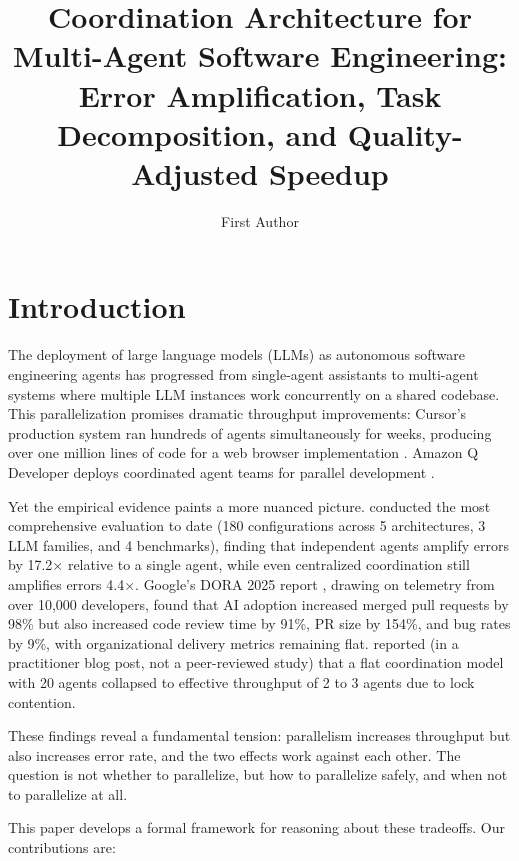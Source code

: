 \documentclass[11pt, a4paper, logo, copyright]{googledeepmind}
\title{Coordination Architecture for Multi-Agent Software Engineering: Error Amplification, Task Decomposition, and Quality-Adjusted Speedup}
\author[1]{First Author}
\begin{document}
\maketitle

\section{Introduction}
\label{sec:intro}

The deployment of large language models (LLMs) as autonomous software engineering agents has progressed from single-agent assistants to multi-agent systems where multiple LLM instances work concurrently on a shared codebase.
This parallelization promises dramatic throughput improvements: Cursor's production system ran hundreds of agents simultaneously for weeks, producing over one million lines of code for a web browser implementation \citep{Cursor2026}.
Amazon Q Developer deploys coordinated agent teams for parallel development \citep{Osmani2025}.

Yet the empirical evidence paints a more nuanced picture.
\citet{Kim2025} conducted the most comprehensive evaluation to date (180 configurations across 5 architectures, 3 LLM families, and 4 benchmarks), finding that independent agents amplify errors by 17.2$\times$ relative to a single agent, while even centralized coordination still amplifies errors 4.4$\times$.
Google's DORA 2025 report \citep{DORA2025}, drawing on telemetry from over 10,000 developers, found that AI adoption increased merged pull requests by 98\% but also increased code review time by 91\%, PR size by 154\%, and bug rates by 9\%, with organizational delivery metrics remaining flat.
\citet{Cursor2026} reported (in a practitioner blog post, not a peer-reviewed study) that a flat coordination model with 20 agents collapsed to effective throughput of 2 to 3 agents due to lock contention.

These findings reveal a fundamental tension: parallelism increases throughput but also increases error rate, and the two effects work against each other.
The question is not whether to parallelize, but how to parallelize safely, and when not to parallelize at all.

This paper develops a formal framework for reasoning about these tradeoffs.
Our contributions are:
\end{document}
